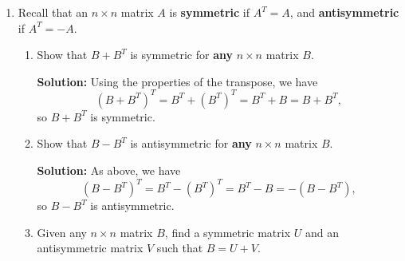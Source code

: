 \documentclass[letterpaper,12pt,reqno]{amsart}
\begin{document}
\begin{enumerate}
\begin{enumerate}
{\bf Solution:} Recall that for any matrix $X$, if we can find a matrix $Y$ such that $XY=I$, then we know that $X$ is invertible, and that $Y=X^{-1}$. Thus, it suffices to show that if $A^2=A$, then $(I-kA)\left(\left(\frac{k}{1-k}\right)A\right)=I$. Thus, let us assume $A^2=A$. We then have
\begin{align*}
 (I-kA)\left(I+\left(\frac{k}{1-k}\right)A\right) & = I + \left(\frac{k}{1-k}\right)A - kA + \left(\frac{k^2}{1-k}\right)A^2\\
& = I + \left(\frac{k}{1-k}\right)A - kA + \left(\frac{k^2}{1-k}\right)A \tag{since $A^2=A$}\\
& = I + \left(\frac{k}{1-k}-k+\frac{k^2}{1-k}\right)A\\
& = I + \left(\frac{k-k(1-k)+k^2}{1-k}\right)A\\
& = I + \left(\frac{0}{1-k}\right)A\\
& = I + 0 = I,
\end{align*}
which is what we needed to show.

\bigskip

\end{enumerate}

\bigskip


\item Recall that an $n\times n$ matrix $A$ is {\bf symmetric} if $A^T=A$, and {\bf antisymmetric} if $A^T=-A$.

\bigskip

\begin{enumerate}
 \item Show that $B+B^T$ is symmetric for {\bf any} $n\times n$ matrix $B$.

\bigskip

{\bf Solution:} Using the properties of the transpose, we have
\[
 (B+B^T)^T = B^T+(B^T)^T = B^T+B = B+B^T,
\]
so $B+B^T$ is symmetric.

\bigskip

 \item Show that $B-B^T$ is antisymmetric for {\bf any} $n\times n$ matrix $B$.

\bigskip

{\bf Solution:} As above, we have
\[
 (B-B^T)^T = B^T-(B^T)^T = B^T-B = -(B-B^T),
\]
so $B-B^T$ is antisymmetric.

\bigskip

 \item Given any $n\times n$ matrix $B$, find a symmetric matrix $U$ and an antisymmetric matrix $V$ such that $B=U+V$.
\end{enumerate}


\end{enumerate}
\end{document}
